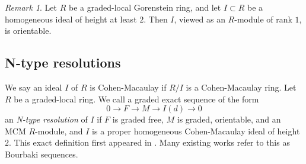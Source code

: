 \documentclass[11pt,letterpaper]{amsart}
\newcommand{\x}{\xrightarrow{}}
\DeclareMathOperator{\rank}{rank}
\theoremstyle{plain}
\theoremstyle{definition}
\theoremstyle{remark}
\newtheorem{remark}[thm]{Remark}
\begin{document}
\begin{remark}Let \(R\) be a graded-local Gorenstein ring, and let \(I\subset R\) be a homogeneous ideal of height at least \(2\). Then \(I\), viewed as an \(R\)-module of rank \(1\), is orientable. \end{remark} %

\subsection{N-type resolutions} 

We say an ideal $I$ of $R$ is Cohen-Macaulay if $R/I$ is a Cohen-Macaulay ring. Let $R$ be a graded-local ring. We call a graded exact sequence of the form $$0\x F\x M\x I(d)\x 0$$ an \emph{N-type resolution} of $I$ if $F$ is graded free, $M$ is graded, orientable, and an MCM $R$-module, and $I$ is a proper homogeneous Cohen-Macaulay ideal of height $2$. This exact definition first appeared in \cite[Chapter~2, Definition~4.5]{perrin1990classification}. Many existing works refer to this as Bourbaki sequences. 
\end{document}
